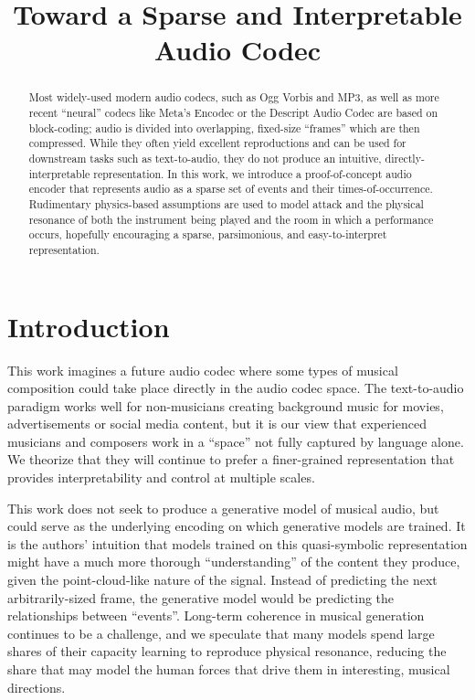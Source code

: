 \documentclass[9pt,conference]{IEEEtran}
\title{Toward a Sparse and Interpretable Audio Codec}
\begin{document}
\maketitle

\begin{abstract}
  Most widely-used modern audio codecs, such as Ogg Vorbis and MP3, as well 
  as more recent ``neural'' codecs like Meta's Encodec\cite{defossez2022highfidelityneuralaudio} 
  or the Descript Audio Codec\cite{kumar2023highfidelityaudiocompressionimproved}
  are based on block-coding; audio is divided into overlapping, 
  fixed-size ``frames'' which are then compressed. While they often yield excellent 
  reproductions and can be used for downstream 
  tasks such as text-to-audio, they do not produce an intuitive, 
  directly-interpretable representation.  In this work, we introduce a 
  proof-of-concept audio encoder that represents audio as a sparse 
  set of events and their times-of-occurrence. Rudimentary physics-based 
  assumptions are used to model attack and the physical resonance of 
  both the instrument being played and the room in which a performance 
  occurs, hopefully encouraging a sparse, parsimonious, and 
  easy-to-interpret representation.
\end{abstract}


\section{Introduction}
\label{sec:intro}

This work imagines a future audio codec where some types of musical 
composition could take place directly in the audio codec space. 
The text-to-audio paradigm works well for non-musicians creating background 
music for movies, advertisements or social media content, but it is 
our view that experienced musicians and composers work in a 
``space'' not fully captured by language alone.  We theorize that they will 
continue to prefer a finer-grained representation that provides 
interpretability and control at multiple scales.

This work does not seek to produce a generative model of musical audio, 
but could serve as the underlying encoding on which generative 
models are trained. It is the authors' intuition that models 
trained on this quasi-symbolic representation might have a 
much more thorough ``understanding'' of the content they produce, 
given the point-cloud-like nature of the signal. Instead of 
predicting the next arbitrarily-sized frame, the generative model 
would be predicting the relationships between ``events''. Long-term 
coherence in musical generation continues to be a challenge, and we 
speculate that many models spend large shares of their capacity 
learning to reproduce physical resonance, reducing the share 
that may model the human forces that drive them in interesting, 
musical directions.
\end{document}
